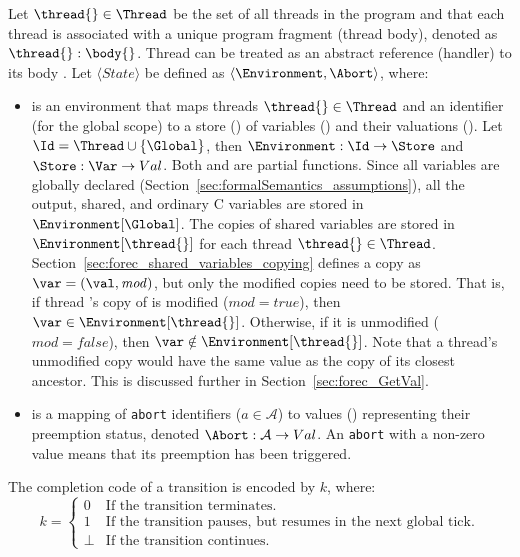 Let $\thread{} \in \Thread$ be the set of all threads in the program 
and that each thread \thread{} is associated with a unique program 
fragment \body{} (thread body), denoted as $\thread{}:\body{}$.
Thread \thread{} can be treated as an abstract reference (handler) to its 
body \body{}. Let $\langle State \rangle$ be defined as 
$\langle \Environment, \Abort \rangle$, where:
\begin{itemize}
	\item \Environment{} is an environment that maps threads $\thread{} \in \Thread$ and an identifier 
		  \Global{} (for the global scope) to a store (\Store{}) of variables (\Var{}) and their 
		  valuations (\Val{}). Let $\Id = \Thread \cup \{\Global\}$, then $\Environment: \Id \to \Store$ and 
		  $\Store: \Var \to Val$. Both \Environment{} and \Store{} are partial functions. 
		  Since all variables are globally declared (Section~\ref{sec:formalSemantics_assumptions}), 
		  all the output, shared, and ordinary C variables are stored in $\Environment[\Global]$. The copies of 
		  shared variables are stored in $\Environment[\thread{}]$ for each thread 
		  $\thread{} \in \Thread$. Section~\ref{sec:forec_shared_variables_copying} defines a 
		  copy as $\var = (\val, \mathit{mod})$, but only the modified copies need to be
		  stored. That is, if thread \thread{}'s copy of \var{} is modified 
		  ($\mathit{mod} = true$), then $\var \in \Environment[\thread{}]$. Otherwise, if it
		  is unmodified ($\mathit{mod} = false$), then $\var \notin \Environment[\thread{}]$. 
		  Note that a thread's unmodified copy would have the same value as the 
		  copy of its closest ancestor. This is discussed further in Section~\ref{sec:forec_GetVal}.
		  
	\item \Abort{} is a mapping of \verb$abort$ identifiers ($a \in \mathcal{A}$) to values 
		  (\Val{}) representing their preemption status, denoted 
		  $\Abort: \mathcal{A} \to Val$. An \verb$abort$ with a non-zero value means that its
		  preemption has been triggered.
\end{itemize}
The completion code of a transition is encoded by $k$, where:
\begin{equation*}
	k = \begin{cases}
		0		& \text{If the transition terminates.}										\\
		1		& \text{If the transition pauses, but resumes in the next global tick.}		\\
		\bot	& \text{If the transition continues.}
	\end{cases}
\end{equation*}


